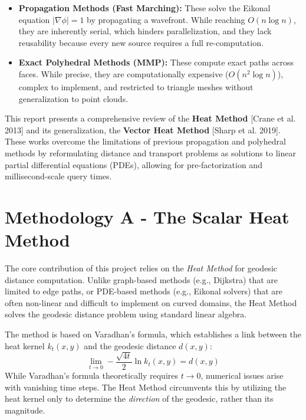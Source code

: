 \documentclass[11pt,a4paper]{article}
\begin{document}
\begin{itemize}[leftmargin=*, nosep]
    \sloppy 
    \item \textbf{Propagation Methods (Fast Marching):} These solve the Eikonal equation $|\nabla \phi| = 1$ by propagating a wavefront. While reaching $O(n \log n)$, they are inherently serial, which hinders parallelization, and they lack reusability because every new source requires a full re-computation.
    
    \item \textbf{Exact Polyhedral Methods (MMP):} These compute exact paths across faces. While precise, they are computationally expensive ($O(n^2 \log n)$), complex to implement, and restricted to triangle meshes without generalization to point clouds.
\end{itemize}

\smallskip
\noindent This report presents a comprehensive review of the \textbf{Heat Method} [Crane et al. 2013] and its generalization, the \textbf{Vector Heat Method} [Sharp et al. 2019]. These works overcome the limitations of previous propagation and polyhedral methods by reformulating distance and transport problems as solutions to linear partial differential equations (PDEs), allowing for pre-factorization and millisecond-scale query times.

\section{Methodology A - The Scalar Heat Method}

The core contribution of this project relies on the \textit{Heat Method} for geodesic distance computation. Unlike graph-based methods (e.g., Dijkstra) that are limited to edge paths, or PDE-based methods (e.g., Eikonal solvers) that are often non-linear and difficult to implement on curved domains, the Heat Method solves the geodesic distance problem using standard linear algebra.

The method is based on Varadhan's formula, which establishes a link between the heat kernel $k_{t}(x, y)$ and the geodesic distance $d(x, y)$:
\begin{equation}
    \lim_{t \to 0} - \frac{\sqrt{4t}}{2} \ln k_{t}(x, y) = d(x, y)
\end{equation}
While Varadhan's formula theoretically requires $t \to 0$, numerical issues arise with vanishing time steps. The Heat Method circumvents this by utilizing the heat kernel only to determine the \textit{direction} of the geodesic, rather than its magnitude.
\end{document}
